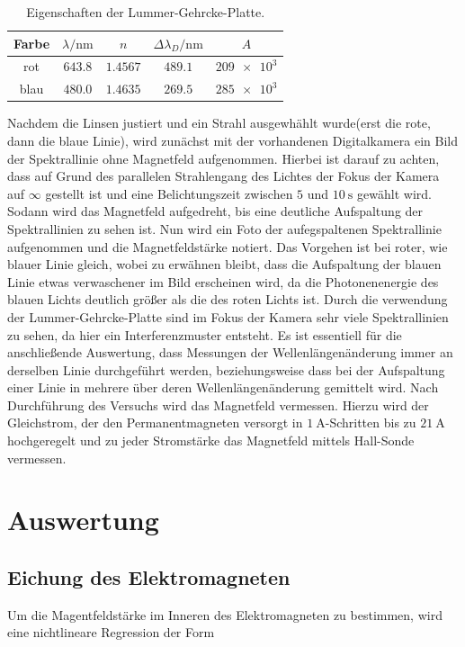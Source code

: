 \begin{table}
    \centering
    \begin{tabular}{ccccc}
		\toprule
		Farbe & $\lambda/\si{\nano\meter}$& $n$ & $\Delta\lambda_D/\si{\nano\meter}$& $A$\\\midrule
		rot & $\num{643,8}$ & $\num{1,4567}$ & $\num{489,1}$ & $\num{209e3}$\\
		blau & $\num{480,0}$& $\num{1,4635}$ & $\num{269,5}$ & $\num{285e3}$\\\bottomrule
\end{tabular}
    \caption{Eigenschaften der Lummer-Gehrcke-Platte.}
    \label{tab3}
\end{table}

\noindent Nachdem die Linsen justiert und ein Strahl ausgewhählt wurde(erst die rote,
dann die blaue Linie), wird zunächst
mit der vorhandenen Digitalkamera ein Bild der Spektrallinie ohne Magnetfeld aufgenommen.
Hierbei ist darauf zu achten, dass auf Grund des parallelen Strahlengang des Lichtes der
Fokus der Kamera auf $\infty$ gestellt ist und eine Belichtungszeit zwischen $5$ und
$\SI{10}{\second}$ gewählt wird.
Sodann wird das Magnetfeld aufgedreht, bis eine deutliche Aufspaltung der Spektrallinien
zu sehen ist. Nun wird ein Foto der aufegspaltenen Spektrallinie aufgenommen und die Magnetfeldstärke
notiert. Das Vorgehen ist bei roter, wie blauer Linie gleich, wobei zu erwähnen bleibt, dass die
Aufspaltung der blauen Linie etwas verwaschener im Bild erscheinen wird, da die Photonenenergie des
blauen Lichts deutlich größer als die des roten Lichts ist.
Durch die verwendung der Lummer-Gehrcke-Platte sind im Fokus der Kamera sehr viele Spektrallinien zu sehen,
da hier ein Interferenzmuster entsteht. Es ist essentiell für die anschließende Auswertung, dass Messungen
der Wellenlängenänderung immer an derselben Linie durchgeführt werden, beziehungsweise dass bei der
Aufspaltung einer Linie in mehrere über deren Wellenlängenänderung gemittelt wird.
Nach Durchführung des Versuchs wird das Magnetfeld vermessen. Hierzu wird der Gleichstrom,
der den Permanentmagneten versorgt in $\SI{1}{\ampere}$-Schritten bis zu $\SI{21}{\ampere}$ hochgeregelt und zu
jeder Stromstärke das Magnetfeld mittels Hall-Sonde vermessen.



\section{Auswertung}
\subsection{Eichung des Elektromagneten}
Um die Magentfeldstärke im Inneren des Elektromagneten zu bestimmen, wird eine nichtlineare Regression der Form

